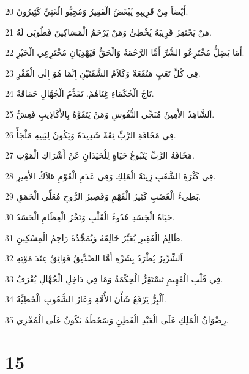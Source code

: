 \par 20 أَيْضاً مِنْ قَرِيبِهِ يُبْغَضُ الْفَقِيرُ وَمُحِبُّو الْغَنِيِّ كَثِيرُونَ.
\par 21 مَنْ يَحْتَقِرُ قَرِيبَهُ يُخْطِئُ وَمَنْ يَرْحَمُ الْمَسَاكِينَ فَطُوبَى لَهُ.
\par 22 أَمَا يَضِلُّ مُخْتَرِعُو الشَّرِّ أَمَّا الرَّحْمَةُ وَالْحَقُّ فَيَهْدِيَانِ مُخْتَرِعِي الْخَيْرِ.
\par 23 فِي كُلِّ تَعَبٍ مَنْفَعَةٌ وَكَلاَمُ الشَّفَتَيْنِ إِنَّمَا هُوَ إِلَى الْفَقْرِ.
\par 24 تَاجُ الْحُكَمَاءِ غِنَاهُمْ. تَقَدُّمُ الْجُهَّالِ حَمَاقَةٌ.
\par 25 اَلشَّاهِدُ الأَمِينُ مُنَجِّي النُّفُوسِ وَمَنْ يَتَفَوَّهُ بِالأَكَاذِيبِ فَغِشٌّ.
\par 26 فِي مَخَافَةِ الرَّبِّ ثِقَةٌ شَدِيدَةٌ وَيَكُونُ لِبَنِيهِ مَلْجَأٌ.
\par 27 مَخَافَةُ الرَّبِّ يَنْبُوعُ حَيَاةٍ لِلْحَيَدَانِ عَنْ أَشْرَاكِ الْمَوْتِ.
\par 28 فِي كَثْرَةِ الشَّعْبِ زِينَةُ الْمَلِكِ وَفِي عَدَمِ الْقَوْمِ هَلاَكُ الأَمِيرِ.
\par 29 بَطِيءُ الْغَضَبِ كَثِيرُ الْفَهْمِ وَقَصِيرُ الرُّوحِ مُعَلِّي الْحَمَقِ.
\par 30 حَيَاةُ الْجَسَدِ هُدُوءُ الْقَلْبِ وَنَخْرُ الْعِظَامِ الْحَسَدُ.
\par 31 ظَالِمُ الْفَقِيرِ يُعَيِّرُ خَالِقَهُ وَيُمَجِّدُهُ رَاحِمُ الْمِسْكِينِ.
\par 32 اَلشِّرِّيرُ يُطْرَدُ بِشَرِّهِ أَمَّا الصِّدِّيقُ فَوَاثِقٌ عِنْدَ مَوْتِهِ.
\par 33 فِي قَلْبِ الْفَهِيمِ تَسْتَقِرُّ الْحِكْمَةُ وَمَا فِي دَاخِلِ الْجُهَّالِ يُعْرَفُ.
\par 34 اَلْبِرُّ يَرْفَعُ شَأْنَ الأُمَّةِ وَعَارُ الشُّعُوبِ الْخَطِيَّةُ.
\par 35 رِضْوَانُ الْمَلِكِ عَلَى الْعَبْدِ الْفَطِنِ وَسَخَطُهُ يَكُونُ عَلَى الْمُخْزِي.

\chapter{15}


